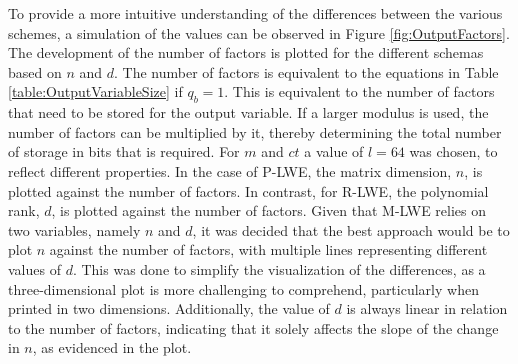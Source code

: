 To provide a more intuitive understanding of the differences between the various schemes, a simulation of the values can be observed in Figure \ref{fig:OutputFactors}. The development of the number of factors is plotted for the different schemas based on $n$ and $d$. The number of factors is equivalent to the equations in Table \ref{table:OutputVariableSize} if $q_b=1$. This is equivalent to the number of factors that need to be stored for the output variable. If a larger modulus is used, the number of factors can be multiplied by it, thereby determining the total number of storage in bits that is required. For $m$ and $ct$ a value of $l=64$ was chosen, to reflect different properties. In the case of P-LWE, the matrix dimension, $n$, is plotted against the number of factors. In contrast, for R-LWE, the polynomial rank, $d$, is plotted against the number of factors. Given that M-LWE relies on two variables, namely $n$ and $d$, it was decided that the best approach would be to plot $n$ against the number of factors, with multiple lines representing different values of $d$. This was done to simplify the visualization of the differences, as a three-dimensional plot is more challenging to comprehend, particularly when printed in two dimensions. Additionally, the value of $d$ is always linear in relation to the number of factors, indicating that it solely affects the slope of the change in $n$, as evidenced in the plot.


